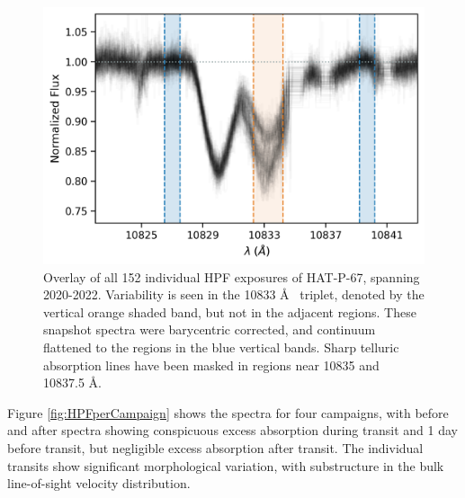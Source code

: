 \documentclass[twocolumn]{aastex631}
\begin{document}
\begin{figure}
    \includegraphics[width=\linewidth]{figures/HAT_P_67b_He_spectrum.png}
    \caption{Overlay of all 152 individual HPF exposures of HAT-P-67, spanning 2020-2022. Variability is seen in the  10833 \AA~ triplet, denoted by the vertical orange shaded band, but not in the adjacent regions.  These snapshot spectra were barycentric corrected, and continuum flattened to the regions in the blue vertical bands.  Sharp telluric absorption lines have been masked in regions near 10835 and 10837.5 \AA.}
    \label{fig:HPFheliumOverview}
\end{figure}

Figure \ref{fig:HPFperCampaign} shows the spectra for four campaigns, with before and after spectra showing conspicuous excess absorption during transit and 1 day before transit, but negligible excess absorption after transit.  The individual transits show significant morphological variation, with substructure in the bulk line-of-sight velocity distribution.
\end{document}
